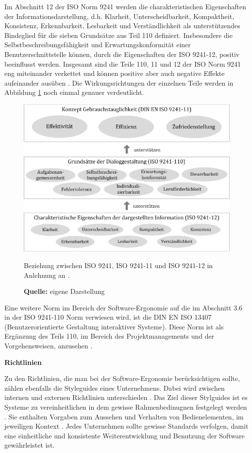 Im Abschnitt 12 der ISO Norm 9241 werden die charakteristischen Eigenschaften der Informationsdarstellung, d.h. Klarheit, Unterscheidbarkeit, Kompaktheit, Konsistenz, Erkennbarkeit, Lesbarkeit und Verständlichkeit als unterstützendes Bindeglied für die sieben Grundsätze aus Teil 110 definiert. Insbesondere die Selbstbeschreibungsfähigkeit und Erwartungskonformität einer Benutzerschnittstelle können, durch die Eigenschaften der ISO 9241-12, positiv beeinflusst werden. Insgesamt sind die Teile 110, 11 und 12 der ISO Norm 9241 eng miteinander verkettet und können positive aber auch negative Effekte aufeinander ausüben \citep[vgl.][Kap. 6]{ISO9241-110}. Die Wirkungsrichtungen der einzelnen Teile werden in Abbildung \ref{fig:beziehungIsoNormen} noch einmal genauer verdeutlicht.
\begin{figure}[H]
  \centering
  \includegraphics[scale=0.86]{img/Beziehung_ISO9241_ISO9241-11_ISO9241-12.png}
  \caption{Beziehung zwischen ISO 9241, ISO 9241-11 und ISO 9241-12 in Anlehnung an \citep[]{ISO9241-110}.}
  \caption*{\textbf{Quelle:} eigene Darstellung}
  \label{fig:beziehungIsoNormen}
\end{figure}
Eine weitere Norm im Bereich der Software-Ergonomie auf die im Abschnitt 3.6 in der ISO 9241-110 Norm verwiesen wird, ist die DIN EN ISO 13407 (Benutzerorientierte Gestaltung interaktiver Systeme). Diese Norm ist als Ergänzung des Teils 110, im Bereich des Projektmanagements und der Vorgehensweisen, anzusehen \citep[vgl.][58]{Schneider2008}.

\textbf{Richtlinien}

Zu den Richtlinien, die man bei der Software-Ergonomie berücksichtigen sollte, zählen ebenfalls die Styleguides eines Unternehmens. Dabei wird zwischen internen und externen Richtlinien unterschieden \citep[vgl.][74]{Richter2013}. Das Ziel dieser Stylguides ist es Systeme zu vereinheitlichen in dem gewisse Rahmenbedinugnen festgelegt werden \citep[vgl.][]{Sarodnick2011}. Sie enthalten Vorgaben zum Aussehen und Verhalten von Bedienelementen, im jeweiligen Kontext \citep[vgl.][72]{Richter2013}. Jedes Unternehmen sollte gewisse Standards verfolgen, damit eine einheitliche und konsistente Weiterentwicklung und Benutzung der Software gewährleistet ist.

